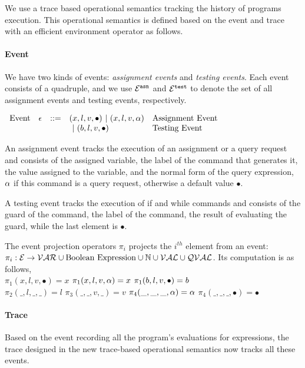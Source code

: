 

We use a trace based operational semantics tracking the history of programs execution.
This operational semantics is defined based on the event and trace with an efficient 
environment operator as follows.


\paragraph{Event}
We have two kinds of events: \emph{assignment events} and \emph{testing events}. 
Each event consists of a quadruple,
and we use $\mathcal{E}^{\mathtt{{asn}}}$ and $\mathcal{E}^{\mathtt{{test}}}$ to denote the set of all assignment events and testing events, respectively.
\begin{center}
$ \begin{array}{lllll}
\mbox{Event} 
& \mathtt{\epsilon} & ::= & 
({x}, l, v, \bullet) ~|~ ({x}, l, v, \alpha)  & \mbox{Assignment Event} \\
&&& ~|~(b, l, v, \bullet)  & \mbox{Testing Event}
\\
\end{array}$
\end{center}
An assignment event tracks the execution of an assignment  or a query request and consists of the assigned variable, the label of the command that generates it, the value assigned to the variable, and the normal form of the query expression, $\alpha$ if this command is a query request, otherwise a default value $\bullet$.

A testing event tracks the execution of if and while commands and consists of the guard of the command, the label of the command, the result of evaluating the guard, while the last element is $\bullet$.

The event projection operators $\pi_i$ projects the $i^{th}$ element from an event:
$ \pi_i : 
\mathcal{E} \to \mathcal{VAR}\cup \mbox{Boolean Expression}  \cup \mathbb{N} \cup \mathcal{VAL} \cup \mathcal{QVAL} $.
Its computation is as follows,
\\
$\pi_1(x, l, v, \bullet) = x $ \qquad  $\pi_1({x}, l, v, \alpha) = x$ \qquad $ \pi_1(b, l, v, \bullet) = b$
\\
$\pi_2(\_, l, \_, \_ ) = l$
\qquad
$\pi_3(\_, \_, v, \_) = v$
\qquad
$\pi_4(\_, \_, \_, \alpha) = \alpha$ \qquad $\pi_4(\_, \_, \_, \bullet) = \bullet$

\paragraph{Trace}
Based on the event recording all the program's evaluations for expressions, 
 the trace designed in the new trace-based operational semantics
 now tracks all these events.

